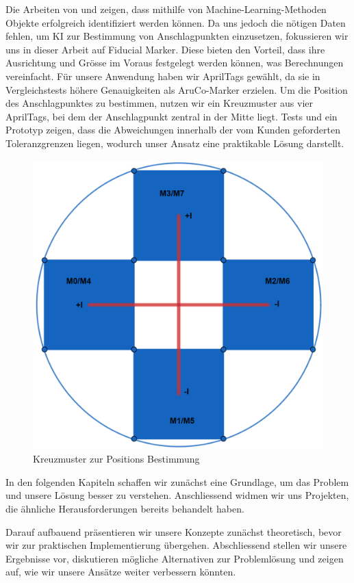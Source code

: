 Die Arbeiten von \cite{yong_object_2023} und \cite{zhou_image-based_2021} zeigen, dass mithilfe von Machine-Learning-Methoden Objekte erfolgreich identifiziert werden können.
Da uns jedoch die nötigen Daten fehlen, um KI zur Bestimmung von Anschlagpunkten einzusetzen, fokussieren wir uns in dieser Arbeit auf Fiducial Marker. Diese bieten den Vorteil, 
dass ihre Ausrichtung und Grösse im Voraus festgelegt werden können, was Berechnungen vereinfacht. Für unsere Anwendung haben wir AprilTags gewählt, da sie in Vergleichstests höhere 
Genauigkeiten als AruCo-Marker erzielen. Um die Position des Anschlagpunktes zu bestimmen, nutzen wir ein Kreuzmuster aus vier AprilTags, bei dem der Anschlagpunkt zentral in der Mitte liegt.
Tests und ein Prototyp zeigen, dass die Abweichungen innerhalb der vom Kunden geforderten Toleranzgrenzen liegen, wodurch unser Ansatz eine praktikable Lösung darstellt.

\begin{figure}[H]
    \centering
    \includegraphics[width=0.5\linewidth]{graphics/marker_anordnung.png}
    \caption{Kreuzmuster zur Positions Bestimmung}
\end{figure}


In den folgenden Kapiteln schaffen wir zunächst eine Grundlage, um das Problem und unsere Lösung besser zu verstehen. Anschliessend 
widmen wir uns Projekten, die ähnliche Herausforderungen bereits behandelt haben.

Darauf aufbauend präsentieren wir unsere Konzepte zunächst theoretisch, bevor wir zur praktischen Implementierung 
übergehen. Abschliessend stellen wir unsere Ergebnisse vor, diskutieren mögliche Alternativen zur Problemlösung und 
zeigen auf, wie wir unsere Ansätze weiter verbessern könnten.


